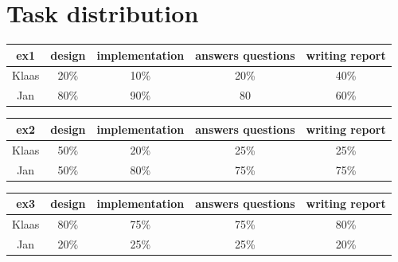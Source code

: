 \documentclass[a4paper]{article}
\begin{document}
\newpage
\section*{Task distribution}

\begin{table}[H]
\centering
\begin{tabular}{ccccc}
ex1 & design & implementation & answers questions & writing report \\
\hline
Klaas & 20\% & 10\% & 20\% & 40\% \\
\hline
Jan & 80\% & 90\% & 80\5 & 60\% \\
\end{tabular}
\end{table}

\begin{table}[H]
\centering
\begin{tabular}{ccccc}
ex2 & design & implementation & answers questions & writing report \\
\hline
Klaas & 50\% & 20\% & 25\% & 25\% \\
\hline
Jan & 50\% & 80\% & 75\% & 75\% \\
\end{tabular}
\end{table}

\begin{table}[H]
\centering
\begin{tabular}{ccccc}
ex3 & design & implementation & answers questions & writing report \\
\hline
Klaas & 80\% & 75\% & 75\% & 80\% \\
\hline
Jan & 20\% & 25\% & 25\% & 20\% \\
\end{tabular}
\end{table} 
\end{document}
